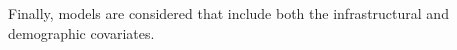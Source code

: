 Finally, models are considered that include both the infrastructural and demographic covariates. \\
